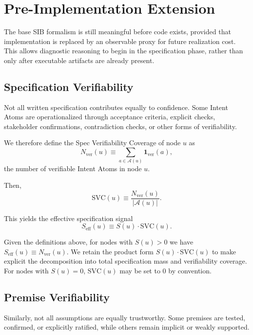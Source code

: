 \documentclass[twocolumn]{aastex701}
\begin{document}
\section{Pre-Implementation Extension}

The base SIB formalism is still meaningful before code exists,
provided that implementation is replaced by an observable proxy for
future realization cost.
This allows diagnostic reasoning to begin in the specification phase,
rather than only after executable artifacts are already present.

\subsection{Specification Verifiability}

Not all written specification contributes equally to confidence.
Some Intent Atoms are operationalized through acceptance criteria,
explicit checks, stakeholder confirmations, contradiction checks,
or other forms of verifiability.

We therefore define the Spec Verifiability Coverage of node $u$ as
\begin{equation}
N_{\mathrm{ver}}(u) \equiv
\sum_{a \in \mathcal{A}(u)} \mathbf{1}_{\mathrm{ver}}(a),
\end{equation}
the number of verifiable Intent Atoms in node $u$.

Then,
\begin{equation}
\mathrm{SVC}(u) \equiv
\frac{N_{\mathrm{ver}}(u)}
{|\mathcal{A}(u)|}.
\end{equation}

This yields the effective specification signal
\begin{equation}
S_{\mathrm{eff}}(u) \equiv S(u)\cdot \mathrm{SVC}(u).
\end{equation}

Given the definitions above, for nodes with $S(u)>0$ we have
$S_{\mathrm{eff}}(u) \equiv N_{\mathrm{ver}}(u)$.
We retain the product form $S(u)\cdot \mathrm{SVC}(u)$ to make explicit
the decomposition into total specification mass and verifiability coverage.
For nodes with $S(u)=0$, $\mathrm{SVC}(u)$ may be set to $0$ by convention.

\subsection{Premise Verifiability}

Similarly, not all assumptions are equally trustworthy.
Some premises are tested, confirmed, or explicitly ratified,
while others remain implicit or weakly supported.
\end{document}
